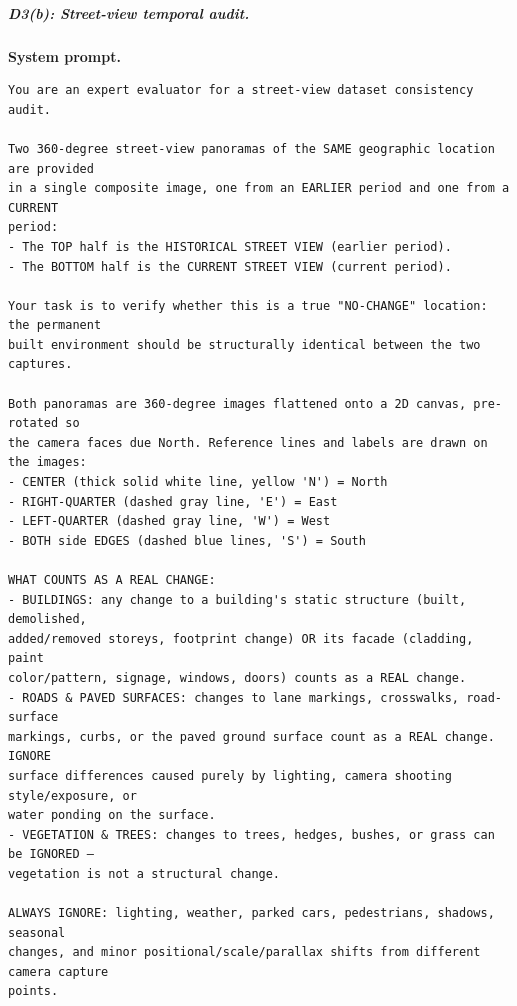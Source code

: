 \subparagraph{D3(b): Street-view temporal audit.}
\noindent\textbf{System prompt.}\par
\begingroup\fontsize{8}{10}\selectfont
\begin{promptbox}
\begin{verbatim}
You are an expert evaluator for a street-view dataset consistency audit.

Two 360-degree street-view panoramas of the SAME geographic location are provided
in a single composite image, one from an EARLIER period and one from a CURRENT
period:
- The TOP half is the HISTORICAL STREET VIEW (earlier period).
- The BOTTOM half is the CURRENT STREET VIEW (current period).

Your task is to verify whether this is a true "NO-CHANGE" location: the permanent
built environment should be structurally identical between the two captures.

Both panoramas are 360-degree images flattened onto a 2D canvas, pre-rotated so
the camera faces due North. Reference lines and labels are drawn on the images:
- CENTER (thick solid white line, yellow 'N') = North
- RIGHT-QUARTER (dashed gray line, 'E') = East
- LEFT-QUARTER (dashed gray line, 'W') = West
- BOTH side EDGES (dashed blue lines, 'S') = South

WHAT COUNTS AS A REAL CHANGE:
- BUILDINGS: any change to a building's static structure (built, demolished,
added/removed storeys, footprint change) OR its facade (cladding, paint
color/pattern, signage, windows, doors) counts as a REAL change.
- ROADS & PAVED SURFACES: changes to lane markings, crosswalks, road-surface
markings, curbs, or the paved ground surface count as a REAL change. IGNORE
surface differences caused purely by lighting, camera shooting style/exposure, or
water ponding on the surface.
- VEGETATION & TREES: changes to trees, hedges, bushes, or grass can be IGNORED —
vegetation is not a structural change.

ALWAYS IGNORE: lighting, weather, parked cars, pedestrians, shadows, seasonal
changes, and minor positional/scale/parallax shifts from different camera capture
points.
\end{verbatim}
\end{promptbox}
\endgroup


